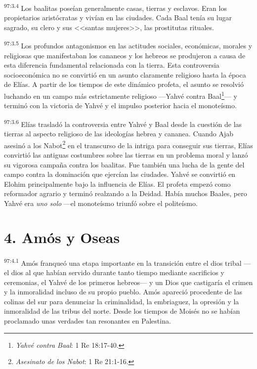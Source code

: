\par
\textsuperscript{97:3.4} Los baalitas poseían generalmente casas, tierras y esclavos. Eran los propietarios aristócratas y vivían en las ciudades. Cada Baal tenía su lugar sagrado, su clero y sus <<santas mujeres>>, las prostitutas rituales.

\par
\textsuperscript{97:3.5} Los profundos antagonismos en las actitudes sociales, económicas, morales y religiosas que manifestaban los cananeos y los hebreos se produjeron a causa de esta diferencia fundamental relacionada con la tierra. Esta controversia socioeconómica no se convirtió en un asunto claramente religioso hasta la época de Elías. A partir de los tiempos de este dinámico profeta, el asunto se resolvió luchando en un campo más estrictamente religioso ---Yahvé contra Baal\footnote{\textit{Yahvé contra Baal}: 1 Re 18:17-40.}--- y terminó con la victoria de Yahvé y el impulso posterior hacia el monoteísmo.

\par
\textsuperscript{97:3.6} Elías trasladó la controversia entre Yahvé y Baal desde la cuestión de las tierras al aspecto religioso de las ideologías hebrea y cananea. Cuando Ajab asesinó a los Nabot\footnote{\textit{Asesinato de los Nabot}: 1 Re 21:1-16.} en el transcurso de la intriga para conseguir sus tierras, Elías convirtió las antiguas costumbres sobre las tierras en un problema moral y lanzó su vigorosa campaña contra los baalitas. Fue también una lucha de la gente del campo contra la dominación que ejercían las ciudades. Yahvé se convirtió en Elohim principalmente bajo la influencia de Elías. El profeta empezó como reformador agrario y terminó realzando a la Deidad. Había muchos Baales, pero Yahvé era \textit{uno solo} ---el monoteísmo triunfó sobre el politeísmo.

\section*{4. Amós y Oseas}
\par
\textsuperscript{97:4.1} Amós franqueó una etapa importante en la transición entre el dios tribal ---el dios al que habían servido durante tanto tiempo mediante sacrificios y ceremonias, el Yahvé de los primeros hebreos--- y un Dios que castigaría el crimen y la inmoralidad incluso de su propio pueblo. Amós apareció procedente de las colinas del sur para denunciar la criminalidad, la embriaguez, la opresión y la inmoralidad de las tribus del norte. Desde los tiempos de Moisés no se habían proclamado unas verdades tan resonantes en Palestina.

